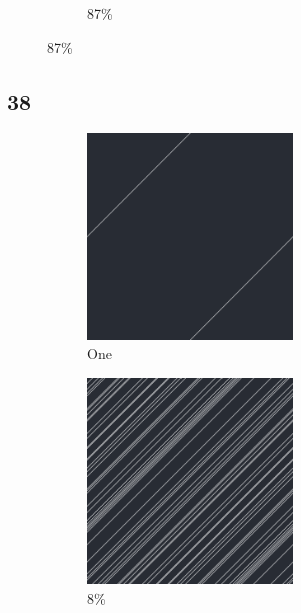 \documentclass[12pt, fleqn]{report}                             %
\theoremstyle{break}                                            %
\begin{document}
\begin{figure}[ht!]
\begin{subfigure}[b]{0.4\linewidth}
          \caption{87\%}
        \end{subfigure}
      \end{figure}


      \clearpage
      \subsection{38}
      \begin{figure}[ht!]
        \centering
        \begin{subfigure}[b]{0.4\linewidth}
          \includegraphics[width=0.6\textwidth]{Images/38/a.png}
          \caption{One}
        \end{subfigure}
        \begin{subfigure}[b]{0.4\linewidth}
          \includegraphics[width=0.6\textwidth]{Images/38/b.png}
          \caption{8\%}
        \end{subfigure}
        \begin{subfigure}[b]{0.4\linewidth}

\end{subfigure}
\end{figure}
\end{document}
